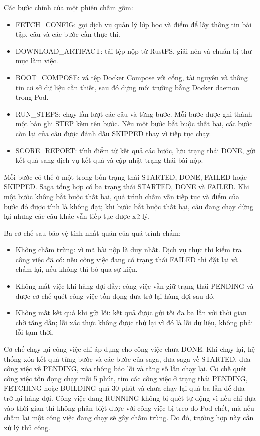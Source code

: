 \documentclass[../BTL.tex]{subfiles}
\begin{document}
Các bước chính của một phiên chấm gồm:
\begin{itemize}
\item FETCH\_CONFIG: gọi dịch vụ quản lý lớp học và điểm để lấy thông tin bài tập, câu và các bước cần thực thi.
\item DOWNLOAD\_ARTIFACT: tải tệp nộp từ RustFS, giải nén và chuẩn bị thư mục làm việc.
\item BOOT\_COMPOSE: vá tệp Docker Compose với cổng, tài nguyên và thông tin cơ sở dữ liệu cần thiết, sau đó dựng môi trường bằng Docker daemon trong Pod.
\item RUN\_STEPS: chạy lần lượt các câu và từng bước. Mỗi bước được ghi thành một bản ghi STEP kèm tên bước. Nếu một bước bắt buộc thất bại, các bước còn lại của câu được đánh dấu SKIPPED thay vì tiếp tục chạy.
\item SCORE\_REPORT: tính điểm từ kết quả các bước, lưu trạng thái DONE, gửi kết quả sang dịch vụ kết quả và cập nhật trạng thái bài nộp.
\end{itemize}

Mỗi bước có thể ở một trong bốn trạng thái STARTED, DONE, FAILED hoặc SKIPPED. Saga tổng hợp có ba trạng thái STARTED, DONE và FAILED. Khi một bước không bắt buộc thất bại, quá trình chấm vẫn tiếp tục và điểm của bước đó được tính là không đạt; khi bước bắt buộc thất bại, câu đang chạy dừng lại nhưng các câu khác vẫn tiếp tục được xử lý.

Ba cơ chế sau bảo vệ tính nhất quán của quá trình chấm:
\begin{itemize}[leftmargin=*, nosep]
\item Không chấm trùng: vì mã bài nộp là duy nhất. Dịch vụ thực thi kiểm tra công việc đã có: nếu công việc đang có trạng thái FAILED thì đặt lại và chấm lại, nếu không thì bỏ qua sự kiện.
\item Không mất việc khi hàng đợi đầy: công việc vẫn giữ trạng thái PENDING và được cơ chế quét công việc tồn đọng đưa trở lại hàng đợi sau đó.
\item Không mất kết quả khi gửi lỗi: kết quả được gửi tối đa ba lần với thời gian chờ tăng dần; lỗi xác thực không được thử lại vì đó là lỗi dữ liệu, không phải lỗi tạm thời.
\end{itemize}

Cơ chế chạy lại công việc chỉ áp dụng cho công việc chưa DONE. Khi chạy lại, hệ thống xóa kết quả từng bước và các bước của saga, đưa saga về STARTED, đưa công việc về PENDING, xóa thông báo lỗi và tăng số lần chạy lại. Cơ chế quét công việc tồn đọng chạy mỗi 5 phút, tìm các công việc ở trạng thái PENDING, FETCHING hoặc BUILDING quá 30 phút và chưa chạy lại quá ba lần để đưa trở lại hàng đợi. Công việc đang RUNNING không bị quét tự động vì nếu chỉ dựa vào thời gian thì không phân biệt được với công việc bị treo do Pod chết, mà nếu chấm lại một công việc đang chạy sẽ gây chấm trùng. Do đó, trường hợp này cần xử lý thủ công.
\end{document}
